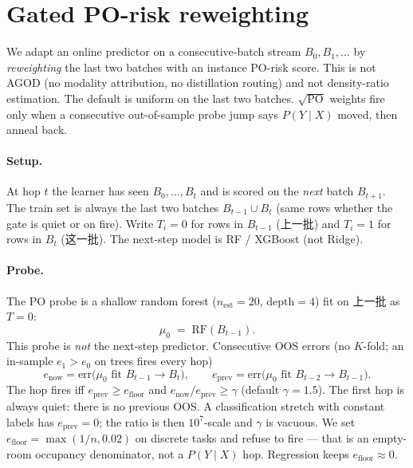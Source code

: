 
\section{Gated PO-risk reweighting}
\label{sec:po-risk-reweight}

We adapt an online predictor on a consecutive-batch stream
$B_0,B_1,\ldots$ by \emph{reweighting} the last two batches with an
instance PO-risk score. This is not AGOD (no modality attribution, no
distillation routing) and not density-ratio estimation. The default is
uniform on the last two batches. $\sqrt{\mathrm{PO}}$ weights fire only
when a consecutive out-of-sample probe jump says $P(Y\mid X)$ moved,
then anneal back.

\paragraph{Setup.}
At hop $t$ the learner has seen $B_0,\ldots,B_t$ and is scored on the
\emph{next} batch $B_{t+1}$. The train set is always the last two
batches $B_{t-1}\cup B_t$ (same rows whether the gate is quiet or on
fire). Write $T_i=0$ for rows in $B_{t-1}$ (上一批) and $T_i=1$ for
rows in $B_t$ (这一批). The next-step model is RF / XGBoost (not Ridge).

\paragraph{Probe.}
The PO probe is a shallow random forest ($n_{\mathrm{est}}=20$,
$\mathrm{depth}=4$) fit on 上一批 as $T=0$:
\begin{equation}
  \mu_0 \;=\; \mathrm{RF}(B_{t-1}).
\end{equation}
This probe is \emph{not} the next-step predictor. Consecutive OOS
errors (no $K$-fold; an in-sample $e_1>e_0$ on trees fires every hop)
\begin{equation}
  e_{\mathrm{now}}
    = \mathrm{err}\bigl(\mu_0 \text{ fit } B_{t-1}\to B_t\bigr),\qquad
  e_{\mathrm{prev}}
    = \mathrm{err}\bigl(\mu_0 \text{ fit } B_{t-2}\to B_{t-1}\bigr).
\end{equation}
The hop fires iff $e_{\mathrm{prev}}\ge e_{\mathrm{floor}}$ and
$e_{\mathrm{now}}/e_{\mathrm{prev}}\ge\gamma$
(default $\gamma=1.5$). The first hop is always quiet: there is no
previous OOS. A classification stretch with constant labels has
$e_{\mathrm{prev}}=0$; the ratio is then $10^{7}$-scale and $\gamma$
is vacuous. We set $e_{\mathrm{floor}}=\max(1/n,0.02)$ on discrete
tasks and refuse to fire --- that is an empty-room occupancy
denominator, not a $P(Y\mid X)$ hop. Regression keeps
$e_{\mathrm{floor}}\approx 0$.

